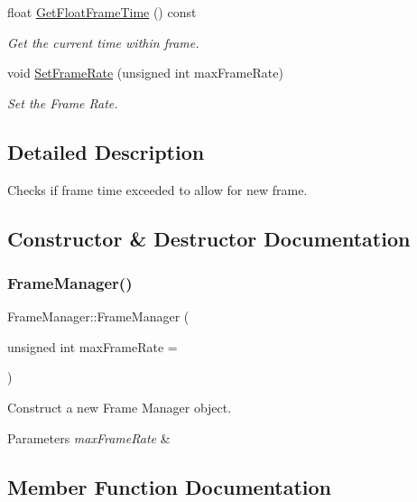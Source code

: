 \begin{DoxyCompactItemize}
float \hyperlink{classFrameManager_af8cee1b8a5061051f09d5e2623586d2e}{Get\+Float\+Frame\+Time} () const
\begin{DoxyCompactList}\small\item\em Get the current time within frame. \end{DoxyCompactList}\item 
void \hyperlink{classFrameManager_a449eb9187116086d6a5ee53c76c84852}{Set\+Frame\+Rate} (unsigned int max\+Frame\+Rate)
\begin{DoxyCompactList}\small\item\em Set the Frame Rate. \end{DoxyCompactList}\end{DoxyCompactItemize}


\subsection{Detailed Description}
Checks if frame time exceeded to allow for new frame. 

\subsection{Constructor \& Destructor Documentation}
\mbox{\label{classFrameManager_a3f1810bcec4dc3118e55e1b1c1cd6197}} 
\subsubsection{\texorpdfstring{Frame\+Manager()}{FrameManager()}}
{\footnotesize\ttfamily Frame\+Manager\+::\+Frame\+Manager (\begin{DoxyParamCaption}\item[{unsigned int}]{max\+Frame\+Rate = {} }\end{DoxyParamCaption})}



Construct a new Frame Manager object. 


\begin{DoxyParams}{Parameters}
{\em max\+Frame\+Rate} & \\
\hline
\end{DoxyParams}


\subsection{Member Function Documentation}
\mbox{\label{classFrameManager_af8cee1b8a5061051f09d5e2623586d2e}} 
